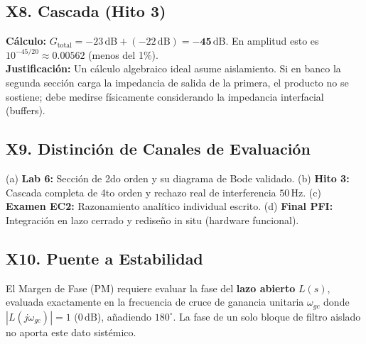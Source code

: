 \documentclass[10pt, a4paper]{article}
\begin{document}
\subsection*{X8. Cascada (Hito 3)}
\textbf{Cálculo:} $G_{\mathrm{total}} = -23\,\mathrm{dB} + (-22\,\mathrm{dB}) = \mathbf{-45\,\mathrm{dB}}$. En amplitud esto es $10^{-45/20} \approx 0.00562$ (menos del 1\%).\\
\textbf{Justificación:} Un cálculo algebraico ideal asume aislamiento. Si en banco la segunda sección carga la impedancia de salida de la primera, el producto no se sostiene; debe medirse físicamente considerando la impedancia interfacial (buffers).

\subsection*{X9. Distinción de Canales de Evaluación}
(a) \textbf{Lab 6:} Sección de 2do orden y su diagrama de Bode validado. (b) \textbf{Hito 3:} Cascada completa de 4to orden y rechazo real de interferencia $50\,\mathrm{Hz}$. (c) \textbf{Examen EC2:} Razonamiento analítico individual escrito. (d) \textbf{Final PFI:} Integración en lazo cerrado y rediseño in situ (hardware funcional).

\subsection*{X10. Puente a Estabilidad}
El Margen de Fase (PM) requiere evaluar la fase del \textbf{lazo abierto} $L(s)$, evaluada exactamente en la frecuencia de cruce de ganancia unitaria $\omega_{gc}$ donde $|L(j\omega_{gc})| = 1$ ($0\,\mathrm{dB}$), añadiendo $180^\circ$. La fase de un solo bloque de filtro aislado no aporta este dato sistémico.
\end{document}
